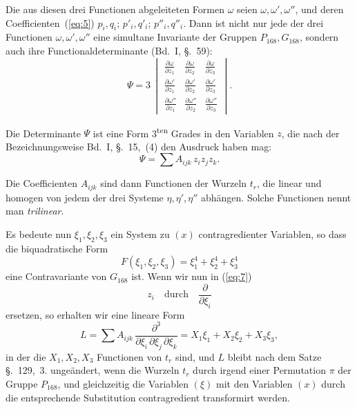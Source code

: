 \documentclass[12pt,a4paper]{article}
\theoremstyle{definition}
\begin{document}
Die aus diesen drei Functionen abgeleiteten Formen $\omega$ seien $\omega,\omega',\omega''$, und deren Coefficienten~(\ref{eq:5}) $p_i,q_i$; $p'_i,q'_i$; $p''_i,q''_i$. Dann ist nicht nur jede der drei Functionen $\omega,\omega',\omega''$ eine simultane Invariante der Gruppen $P_{168}, G_{168}$, sondern auch ihre Functionaldeterminante (Bd.~I, \S.~59):
\begin{equation}\label{eq:6}
\Psi = 3\,\begin{vmatrix}
\frac{\partial\omega}{\partial z_1} & \frac{\partial\omega}{\partial z_2} & \frac{\partial\omega}{\partial z_3}\\[4pt]
\frac{\partial\omega'}{\partial z_1} & \frac{\partial\omega'}{\partial z_2} & \frac{\partial\omega'}{\partial z_3}\\[4pt]
\frac{\partial\omega''}{\partial z_1} & \frac{\partial\omega''}{\partial z_2} & \frac{\partial\omega''}{\partial z_3}
\end{vmatrix}.
\end{equation}

Die Determinante $\Psi$ ist eine Form 3\textsuperscript{ten} Grades in den Variablen $z$, die nach der Bezeichnungsweise Bd.~I, \S.~15,~(4) den Ausdruck haben mag:
\begin{equation}\label{eq:7}
\Psi = \sum A_{ijk}\, z_i z_j z_k.
\end{equation}

Die Coefficienten $A_{ijk}$ sind dann Functionen der Wurzeln $t_r$, die linear und homogen von jedem der drei Systeme $\eta,\eta',\eta''$ abhängen. Solche Functionen nennt man \emph{trilinear}.

Es bedeute nun $\xi_1,\xi_2,\xi_3$ ein System zu $(x)$ contragredienter Variablen, so dass die biquadratische Form
\begin{equation}\label{eq:8}
F(\xi_1,\xi_2,\xi_3) = \xi_1^4 + \xi_2^4 + \xi_3^4
\end{equation}
eine Contravariante von $G_{168}$ ist. Wenn wir nun in (\ref{eq:7})
\[
z_i \quad\text{durch}\quad \frac{\partial}{\partial\xi_i}
\]
ersetzen, so erhalten wir eine lineare Form
\begin{equation}\label{eq:9}
L = \sum A_{ijk}\, \frac{\partial^3}{\partial\xi_i\,\partial\xi_j\,\partial\xi_k}
= X_1\xi_1 + X_2\xi_2 + X_3\xi_3,
\end{equation}
in der die $X_1,X_2,X_3$ Functionen von $t_r$ sind, und $L$ bleibt nach dem Satze \S.~129,~3. ungeändert, wenn die Wurzeln $t_r$ durch irgend einer Permutation $\pi$ der Gruppe $P_{168}$, und gleichzeitig die Variablen $(\xi)$ mit den Variablen $(x)$ durch die entsprechende Substitution contragredient transformirt werden.
\end{document}
